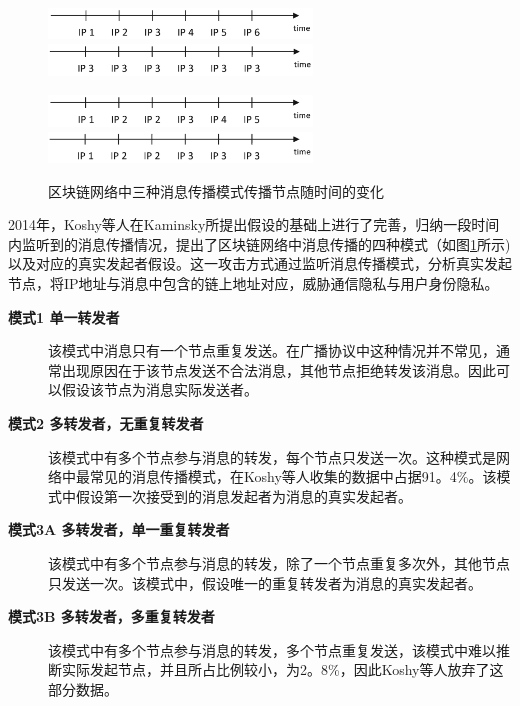 \begin{figure}[ht]
  \centering%
    {\includegraphics[width=7cm]{figures/trans-pattern1.png}}%
  \hspace{2em}%
  	{\includegraphics[width=7cm]{figures/trans-pattern2.png}}

    {\includegraphics[width=7cm]{figures/trans-pattern3.png}}%
  \hspace{2em}%
  	{\includegraphics[width=7cm]{figures/trans-pattern4.png}}
  \caption{区块链网络中三种消息传播模式传播节点随时间的变化}
  \label{fig:trans3}
\end{figure}

2014年，Koshy等人在Kaminsky所提出假设的基础上进行了完善，归纳一段时间内监听到的消息传播情况，提出了区块链网络中消息传播的四种模式（如图\ref{fig:trans3}所示)以及对应的真实发起者假设。这一攻击方式通过监听消息传播模式，分析真实发起节点，将IP地址与消息中包含的链上地址对应，威胁通信隐私与用户身份隐私。

\begin{description}
  \item[\textbf{模式1 单一转发者}] 该模式中消息只有一个节点重复发送。在广播协议中这种情况并不常见，通常出现原因在于该节点发送不合法消息，其他节点拒绝转发该消息。因此可以假设该节点为消息实际发送者。
  \item[\textbf{模式2 多转发者，无重复转发者}] 该模式中有多个节点参与消息的转发，每个节点只发送一次。这种模式是网络中最常见的消息传播模式，在Koshy等人收集的数据中占据91。4\%。该模式中假设第一次接受到的消息发起者为消息的真实发起者。
  \item[\textbf{模式3A 多转发者，单一重复转发者}] 该模式中有多个节点参与消息的转发，除了一个节点重复多次外，其他节点只发送一次。该模式中，假设唯一的重复转发者为消息的真实发起者。
  \item[\textbf{模式3B 多转发者，多重复转发者}] 该模式中有多个节点参与消息的转发，多个节点重复发送，该模式中难以推断实际发起节点，并且所占比例较小，为2。8\%，因此Koshy等人放弃了这部分数据。
\end{description}

